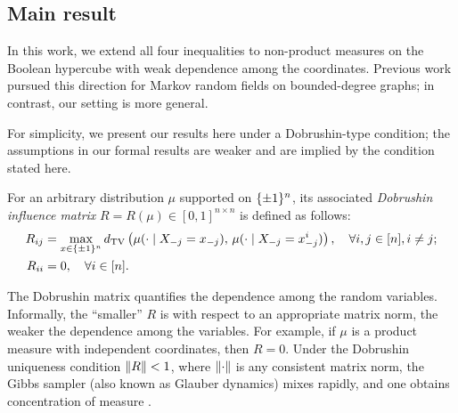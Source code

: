 \subsection{Main result}

In this work, we extend all four inequalities to non-product measures on the Boolean hypercube with weak dependence among the coordinates.
Previous work \cite{KoehlerLifshitzMinzerMossel23} pursued this direction for Markov random fields on bounded-degree graphs; in contrast, our setting is more general.

For simplicity, we present our results here under a Dobrushin-type condition; the assumptions in our formal results are weaker and are implied by the condition stated here.

For an arbitrary distribution $\mu$ supported on $\{\pm 1\}^n$, its associated \emph{Dobrushin influence matrix} $R = R(\mu) \in [0,1]^{n \times n}$ is defined as follows:
\begin{align}
    R_{ij} &= \max_{x \in \{\pm 1\}^n} d_{\mathrm{TV}}\left({\mu(\cdot \mid X_{-j} = x_{-j})},\,{\mu(\cdot \mid X_{-j} = x^i_{-j})}\right), \quad \forall i,j \in [n], i \neq j;\\
    R_{ii} &= 0, \quad \forall i \in [n].
\end{align}


The Dobrushin matrix quantifies the dependence among the random variables.
Informally, the ``smaller'' $R$ is with respect to an appropriate matrix norm, the weaker the dependence among the variables.
For example, if $\mu$ is a product measure with independent coordinates, then $R = 0$. 
Under the Dobrushin uniqueness condition $\left\lVert R \right\rVert < 1$, where $\left\lVert \cdot \right\rVert$ is any consistent matrix norm, the Gibbs sampler (also known as Glauber dynamics) mixes rapidly, and one obtains concentration of measure \cite{Hayes06,DGJ09,marton2019logarithmic,SS20}.

